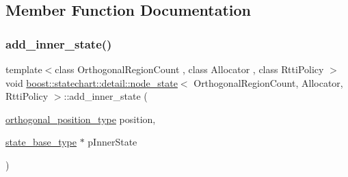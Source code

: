 \subsection{Member Function Documentation}
\mbox{\label{classboost_1_1statechart_1_1detail_1_1node__state_a69765d54be1730efeb31133a3828ff16}} 
\subsubsection{\texorpdfstring{add\+\_\+inner\+\_\+state()}{add\_inner\_state()}}
{\footnotesize\ttfamily template$<$class Orthogonal\+Region\+Count , class Allocator , class Rtti\+Policy $>$ \\
void \mbox{\hyperlink{classboost_1_1statechart_1_1detail_1_1node__state}{boost\+::statechart\+::detail\+::node\+\_\+state}}$<$ Orthogonal\+Region\+Count, Allocator, Rtti\+Policy $>$\+::add\+\_\+inner\+\_\+state (\begin{DoxyParamCaption}\item[{\mbox{\hyperlink{namespaceboost_1_1statechart_1_1detail_a3bedea0b807a16fa222733417183d2c9}{orthogonal\+\_\+position\+\_\+type}}}]{position,  }\item[{\mbox{\hyperlink{classboost_1_1statechart_1_1detail_1_1node__state__base_a2b7ddb7642a5452045d9448444426735}{state\+\_\+base\+\_\+type}} $\ast$}]{p\+Inner\+State }\end{DoxyParamCaption})\hspace{0.3cm}{\ttfamily [inline]}}

\mbox{\label{classboost_1_1statechart_1_1detail_1_1node__state_a58441ed647eb2389e12c3bf341005047}} 
